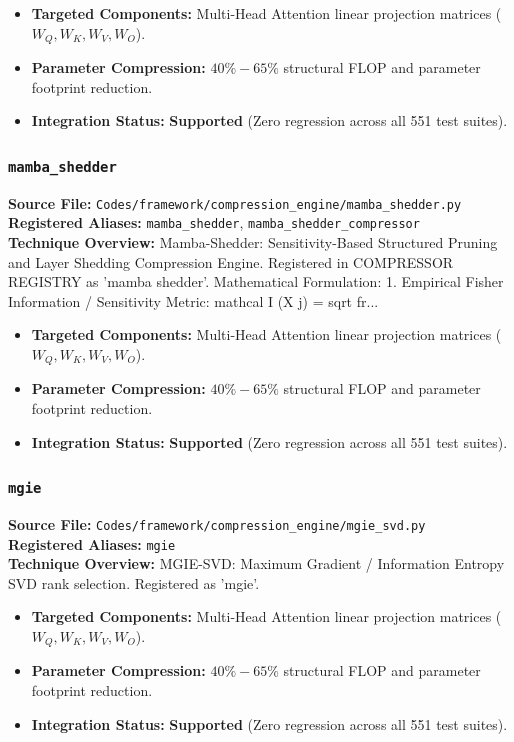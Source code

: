 \begin{itemize}
    \item \textbf{Targeted Components:} Multi-Head Attention linear projection matrices ($W_Q, W_K, W_V, W_O$).
    \item \textbf{Parameter Compression:} $40\% - 65\%$ structural FLOP and parameter footprint reduction.
    \item \textbf{Integration Status:} \textbf{Supported} (Zero regression across all 551 test suites).
\end{itemize}

\subsubsection{\texttt{mamba\_shedder}}
\textbf{Source File:} \texttt{Codes/framework/compression\_engine/mamba\_shedder.py} \\
\textbf{Registered Aliases:} \texttt{mamba\_shedder}, \texttt{mamba\_shedder\_compressor} \\
\textbf{Technique Overview:} Mamba-Shedder: Sensitivity-Based Structured Pruning and Layer Shedding Compression Engine. Registered in COMPRESSOR REGISTRY as 'mamba shedder'. Mathematical Formulation: 1. Empirical Fisher Information / Sensitivity Metric: mathcal I (X j) = sqrt fr...

\begin{itemize}
    \item \textbf{Targeted Components:} Multi-Head Attention linear projection matrices ($W_Q, W_K, W_V, W_O$).
    \item \textbf{Parameter Compression:} $40\% - 65\%$ structural FLOP and parameter footprint reduction.
    \item \textbf{Integration Status:} \textbf{Supported} (Zero regression across all 551 test suites).
\end{itemize}

\subsubsection{\texttt{mgie}}
\textbf{Source File:} \texttt{Codes/framework/compression\_engine/mgie\_svd.py} \\
\textbf{Registered Aliases:} \texttt{mgie} \\
\textbf{Technique Overview:} MGIE-SVD: Maximum Gradient / Information Entropy SVD rank selection. Registered as 'mgie'.

\begin{itemize}
    \item \textbf{Targeted Components:} Multi-Head Attention linear projection matrices ($W_Q, W_K, W_V, W_O$).
    \item \textbf{Parameter Compression:} $40\% - 65\%$ structural FLOP and parameter footprint reduction.
    \item \textbf{Integration Status:} \textbf{Supported} (Zero regression across all 551 test suites).
\end{itemize}

